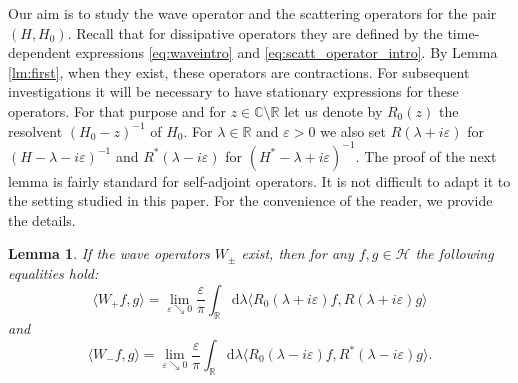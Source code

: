 \documentclass{article}
\def\C{\mathbb C}
\def\d{\mathrm{d}}
\def\H{\mathcal H}
\def\R{\mathbb R}
\newtheorem{Lemma}[Theorem]{Lemma}
\begin{document}
Our aim is to study the wave operator and the scattering operators for the pair $(H,H_0)$.
Recall that for dissipative operators they are defined by the time-dependent expressions \eqref{eq:waveintro} and \eqref{eq:scatt_operator_intro}.
By Lemma \ref{lm:first}, when they exist, these operators are contractions.
For subsequent investigations it will be necessary to have stationary expressions for these operators.
For that purpose and for $z\in \C\setminus \R$ let us denote by 
$R_0(z)$ the resolvent $(H_0-z)^{-1}$ of $H_0$. For  $\lambda \in \R$ and $\varepsilon >0$ we also set $R(\lambda+i\varepsilon)$ for $(H-\lambda -i\varepsilon)^{-1}$
and $R^*(\lambda-i\varepsilon)$ for $(H^*-\lambda +i\varepsilon)^{-1}$.
The proof of the next lemma is fairly standard for self-adjoint operators. It is not difficult to adapt it to the setting studied in this paper. For the convenience of the reader, we provide the details.

\begin{Lemma}\label{lem_statio}
If the wave operators $W_\pm$ exist, then for any $f, g\in \H$ the following equalities hold:
$$
\langle W_+ f,g\rangle 
=  \lim_{\varepsilon\searrow 0}\frac{\varepsilon}{\pi} \int_{\R}\d \lambda 
\langle R_0(\lambda+i \varepsilon)f, R(\lambda + i \varepsilon) g\rangle
$$
and 
$$
\langle W_- f,g\rangle
=  \lim_{\varepsilon\searrow 0}\frac{\varepsilon}{\pi} \int_{\R}\d \lambda 
\langle R_0(\lambda- i \varepsilon)f, R^*(\lambda - i \varepsilon) g\rangle.
$$
\end{Lemma}
\end{document}
